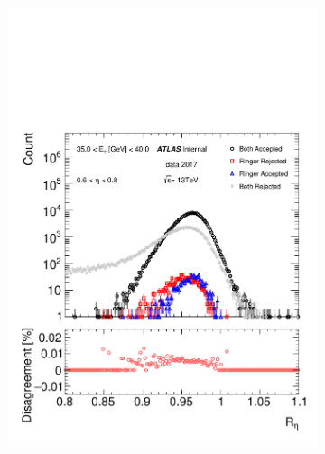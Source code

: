 \begin{figure}[h!]
\centering
\begin{subfigure}[c]{.49\textwidth}
\centering
\includegraphics[width=\textwidth]{sections/04_analysis/figures/quadrant_plots/reta.pdf}
\caption{}
\label{fig:quadrant_calo_variables_30GeV_eta}
\end{subfigure}
\begin{subfigure}[c]{.49\textwidth}
\centering

\end{subfigure}
\end{figure}
